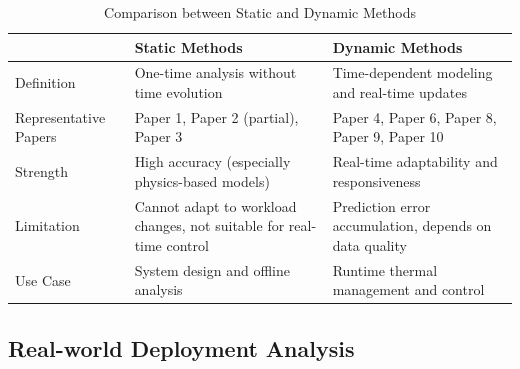 \documentclass[12pt,a4paper]{article}
\begin{document}
            \begin{table}[H]
            \centering
            
            \caption{Comparison between Static and Dynamic Methods}
            \label{tab:static_dynamic}
            \begin{tabular}{p{3cm} p{5cm} p{5cm}}
            \toprule
             & Static Methods & Dynamic Methods \\
            \midrule
            Definition & One-time analysis without time evolution & Time-dependent modeling and real-time updates \\
            
            Representative Papers & Paper 1, Paper 2 (partial), Paper 3 & Paper 4, Paper 6, Paper 8, Paper 9, Paper 10 \\
            
            Strength & High accuracy (especially physics-based models) & Real-time adaptability and responsiveness \\
            
            Limitation & Cannot adapt to workload changes, not suitable for real-time control & Prediction error accumulation, depends on data quality \\
            
            Use Case & System design and offline analysis & Runtime thermal management and control \\
            \bottomrule
            \end{tabular}
            \end{table}
            
    \subsection{Real-world Deployment Analysis}
\end{document}
